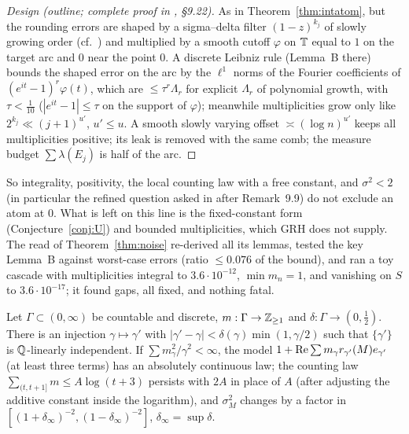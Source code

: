 \begin{proof}[Design (outline; complete proof in , \S9.22)]
As in Theorem~\ref{thm:intatom}, but the rounding errors are shaped by a sigma--delta filter $(1-z)^{k_j}$ of slowly growing order (cf.\ \cite{DD,Gunturk}) and multiplied by a smooth cutoff $\varphi$ on $\mathbb T$ equal to $1$ on the target arc and $0$ near the point $0$. A discrete Leibniz rule (Lemma~B there) bounds the shaped error on the arc by the $\ell^1$ norms of the Fourier coefficients of $(e^{it}-1)^r\varphi(t)$, which are $\le\tau^r\Lambda_r$ for explicit $\Lambda_r$ of polynomial growth, with $\tau<\frac1{10}$ ($|e^{it}-1|\le\tau$ on the support of $\varphi$); meanwhile multiplicities grow only like $2^{k_j}\ll(j+1)^{u'}$, $u'\le u$. A smooth slowly varying offset $\asymp(\log n)^{u'}$ keeps all multiplicities positive; its leak is removed with the same comb; the measure budget $\sum\lambda(E_j)$ is half of the arc.
\end{proof}

So integrality, positivity, the local counting law with a free constant, and $\sigma^2<2$ (in particular the refined question asked in  after Remark~9.9) do not exclude an atom at $0$. What is left on this line is the fixed-constant form (Conjecture~\ref{conj:U}) and bounded multiplicities, which GRH does not supply. The read of Theorem~\ref{thm:noise} re-derived all its lemmas, tested the key Lemma~B against worst-case errors (ratio $\le0.076$ of the bound), and ran a toy cascade with multiplicities integral to $3.6\cdot10^{-12}$, $\min m_n=1$, and vanishing on $S$ to $3.6\cdot10^{-17}$; it found gaps, all fixed, and nothing fatal.

\begin{proposition}\label{prop:LIdense}
Let $\Gamma\subset(0,\infty)$ be countable and discrete, $m:\Gamma\to\mathbb Z_{\ge1}$ and $\delta:\Gamma\to(0,\frac12)$. There is an injection $\gamma\mapsto\gamma'$ with $|\gamma'-\gamma|<\delta(\gamma)\min(1,\gamma/2)$ such that $\{\gamma'\}$ is $\mathbb Q$-linearly independent. If $\sum m_\gamma^2/\gamma^2<\infty$, the model $1+\operatorname{Re}\sum m_\gamma r_{\gamma'}(M)e_{\gamma'}$ (at least three terms) has an absolutely continuous law; the counting law $\sum_{(t,t+1]}m\le A\log(t+3)$ persists with $2A$ in place of $A$ (after adjusting the additive constant inside the logarithm), and $\sigma_M^2$ changes by a factor in $[(1+\delta_\infty)^{-2},(1-\delta_\infty)^{-2}]$, $\delta_\infty=\sup\delta$.
\end{proposition}

